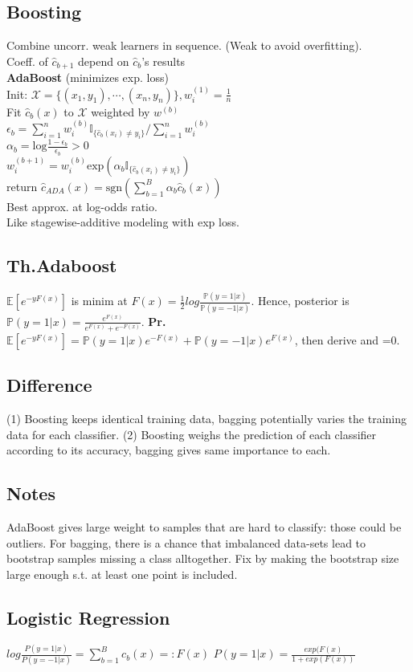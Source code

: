 \subsection*{Boosting}
Combine uncorr. weak learners in sequence. (Weak to avoid overfitting).\\
Coeff. of $\hat{c}_{b+1}$ depend on $\hat{c}_{b}$'s results\\
\textbf{AdaBoost} (minimizes exp. loss)\\
Init: $\mathcal{X}{=}\{(x_1,y_1),\cdots,(x_n,y_n)\}, w_i^{(1)}{=}\frac{1}{n}$\\
Fit  $\hat{c}_b(x)$ to $\mathcal{X}$ weighted by $w^{(b)}$\\
$\epsilon_b=\sum_{i=1}^nw_i^{(b)}\mathbb{I}_{\{\hat c_b(x_i)\not=y_i\}}/\sum_{i=1}^nw_i^{(b)}$\\
$\alpha_b = \mathrm{log}\frac{1-\epsilon_b}{\epsilon_b}>0$\\
$w_i^{(b+1)}=w_i^{(b)}\mathrm{exp}(\alpha_b\mathbb{I}_{\{{\hat c_b(x_i)\not=y_i}\}})$\\
return $\hat{c}_{ADA}(x){=}\mathrm{sgn}(\sum_{b{=}1}^B\alpha_b \hat c_b(x))$\\
Best approx. at log-odds ratio. \\
Like stagewise-additive modeling with exp loss.

\subsection*{Th.Adaboost}
$\mathbb E[e^{-yF(x)}]$ is minim at $F(x)=\frac 12 log\frac{\mathbb P(y=1|x)}{\mathbb P(y=-1|x)}$. Hence, posterior is $\mathbb P(y=1|x)=\frac{e^{F(x)}}{e^{F(x)}+e^{-F(x)}}$. \textbf{Pr.} $\mathbb E[e^{-yF(x)}]=\mathbb P(y=1|x)e^{-F(x)}+\mathbb P(y=-1|x)e^{F(x)}$, then derive and =0.

\subsection*{Difference}
(1) Boosting keeps identical training data, bagging potentially varies the training data for each classifier. (2) Boosting weighs the prediction of each classifier according to its accuracy, bagging gives same importance to each.

\subsection*{Notes}
AdaBoost gives large weight to samples that are hard to classify: those could be outliers. For bagging, there is a chance that imbalanced data-sets lead to bootstrap samples missing a class alltogether. Fix by making the bootstrap size large enough s.t. at least one point is included.
\subsection*{Logistic Regression}
$log\frac{P(y=1|x)}{P(y=-1|x)} = \sum_{b=1}^Bc_b(x) =: F(x)$
$P(y=1|x) = \frac{exp(F(x)}{1+exp(F(x))}$





